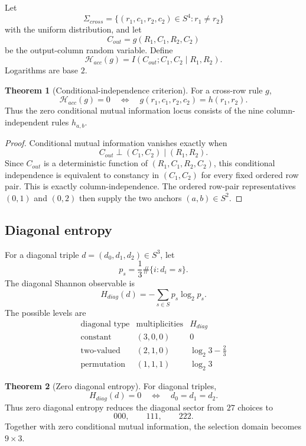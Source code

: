 \documentclass[11pt]{article}
\theoremstyle{definition}
\newtheorem{theorem}{Theorem}[section]
\begin{document}
Let
\[
\Sigma_{cross}=\{(r_1,c_1,r_2,c_2)\in S^4:r_1\ne r_2\}
\]
with the uniform distribution, and let
\[
C_{out}=g(R_1,C_1,R_2,C_2)
\]
be the output-column random variable.  Define
\[
\boxed{
\mathcal H_{acc}(g)=I(C_{out};C_1,C_2\mid R_1,R_2).
}
\]
Logarithms are base \(2\).

\begin{theorem}[Conditional-independence criterion]
\label{thm:3.1}
For a cross-row rule \(g\),
\[
\mathcal H_{acc}(g)=0
\quad\Longleftrightarrow\quad
 g(r_1,c_1,r_2,c_2)=h(r_1,r_2).
\]
Thus the zero conditional mutual information locus consists of the nine column-independent rules
\(h_{a,b}\).
\end{theorem}

\begin{proof}
Conditional mutual information vanishes exactly when
\[
C_{out}\perp (C_1,C_2)\mid (R_1,R_2).
\]
Since \(C_{out}\) is a deterministic function of
\((R_1,C_1,R_2,C_2)\), this conditional independence is equivalent to
constancy in \((C_1,C_2)\) for every fixed ordered row pair.  This is exactly
column-independence.  The ordered row-pair representatives \((0,1)\) and
\((0,2)\) then supply the two anchors \((a,b)\in S^2\).
\end{proof}

\subsection{Diagonal entropy}\label{diagonal-entropy}\label{zero-diagonal-entropy}

For a diagonal triple \(d=(d_0,d_1,d_2)\in S^3\), let
\[
p_s=\frac13\#\{i:d_i=s\}.
\]
The diagonal Shannon observable is
\[
\boxed{
H_{diag}(d)=-\sum_{s\in S}p_s\log_2 p_s.
}
\]
The possible levels are
\[
\begin{array}{c|c|c}
\text{diagonal type} & \text{multiplicities} & H_{diag} \\
\hline
\text{constant} & (3,0,0) & 0 \\
\text{two-valued} & (2,1,0) & \log_2 3-\frac23 \\
\text{permutation} & (1,1,1) & \log_2 3
\end{array}
\]

\begin{theorem}[Zero diagonal entropy]
\label{thm:9.1}
For diagonal triples,
\[
H_{diag}(d)=0
\quad\Longleftrightarrow\quad
 d_0=d_1=d_2.
\]
Thus zero diagonal entropy reduces the diagonal sector from \(27\) choices to
\[
000,
\qquad 111,
\qquad 222.
\]
Together with zero conditional mutual information, the selection domain becomes \(9\times3\).
\end{theorem}
\end{document}
